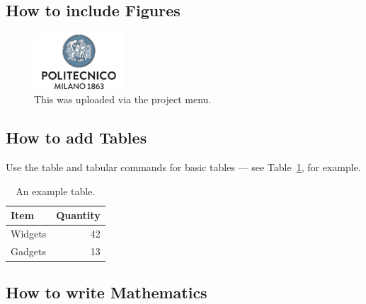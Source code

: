 \documentclass[a4paper]{article}
\begin{document}

\subsection{How to include Figures}

\begin{figure}[h]
\centering
\includegraphics[width=0.3\textwidth]{resources/polimi.png}
\caption{\label{fig:frog}This was uploaded via the project menu.}
\end{figure}

\subsection{How to add Tables}

Use the table and tabular commands for basic tables --- see Table~\ref{tab:widgets}, for example. 

\begin{table}[h]
\centering
\begin{tabular}{l|r}
Item & Quantity \\\hline
Widgets & 42 \\
Gadgets & 13
\end{tabular}
\caption{\label{tab:widgets}An example table.}
\end{table}

\subsection{How to write Mathematics}
\end{document}
